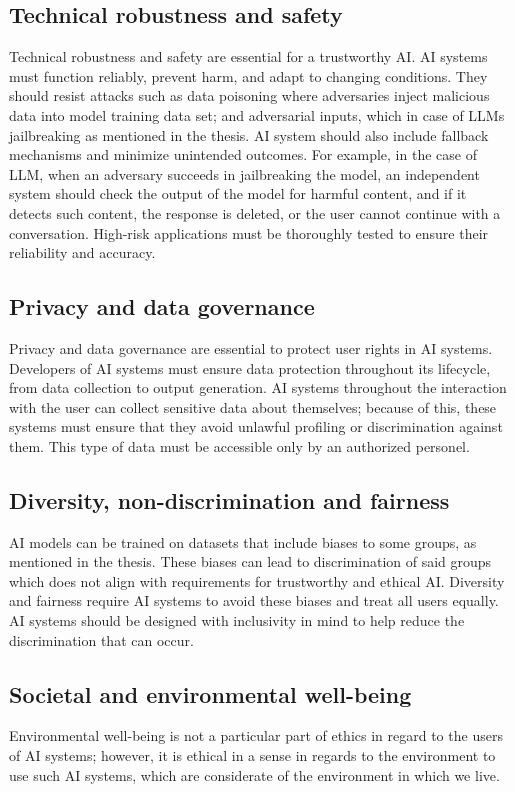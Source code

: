 \subsection*{Technical robustness and safety}
Technical robustness and safety are essential for a trustworthy AI. AI systems must function reliably, prevent harm, and adapt to changing conditions. They should resist attacks such as data poisoning where adversaries inject malicious data into model training data set; and adversarial inputs, which in case of LLMs jailbreaking as mentioned in the thesis. AI system should also include fallback mechanisms and minimize unintended outcomes. For example, in the case of LLM, when an adversary succeeds in jailbreaking the model, an independent system should check the output of the model for harmful content, and if it detects such content, the response is deleted, or the user cannot continue with a conversation. High-risk applications must be thoroughly tested to ensure their reliability and accuracy.

\subsection*{Privacy and data governance}
Privacy and data governance are essential to protect user rights in AI systems. Developers of AI systems must ensure data protection throughout its lifecycle, from data collection to output generation. AI systems throughout the interaction with the user can collect sensitive data about themselves; because of this, these systems must ensure that they avoid unlawful profiling or discrimination against them. This type of data must be accessible only by an authorized personel.

\subsection*{Diversity, non-discrimination and fairness}
AI models can be trained on datasets that include biases to some groups, as mentioned in the thesis. These biases can lead to discrimination of said groups which does not align with requirements for trustworthy and ethical AI. Diversity and fairness require AI systems to avoid these biases and treat all users equally. AI systems should be designed with inclusivity in mind to help reduce the discrimination that can occur.

\subsection*{Societal and environmental well-being}
Environmental well-being is not a particular part of ethics in regard to the users of AI systems; however, it is ethical in a sense in regards to the environment to use such AI systems, which are considerate of the environment in which we live.

